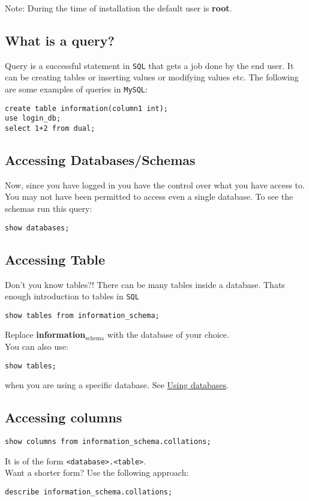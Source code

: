\documentclass[11pt]{article}
\begin{document}
Note: During the time of installation the default user is \textbf{root}.
\subsection{What is a query?}
\label{sec:org04b6374}
Query is a successful statement in \texttt{SQL} that gets a job done
by the end user. It can be creating tables or inserting values
or modifying values etc. The following are some examples of
queries in \texttt{MySQL}:
\begin{verbatim}
create table information(column1 int);
use login_db;
select 1+2 from dual;
\end{verbatim}
\subsection{Accessing Databases/Schemas}
\label{sec:org38fbf5d}
Now, since you have logged in you have the control over what
you have access to. You may not have been permitted to access
even a single database. To see the schemas run this query:
\begin{verbatim}
show databases;
\end{verbatim}
\subsection{Accessing Table}
\label{sec:orgc936a6d}
Don't you know tables?!
There can be many tables inside a database. Thats enough
introduction to tables in \texttt{SQL}
\begin{verbatim}
show tables from information_schema;
\end{verbatim}
Replace \textbf{information\(_{\text{schema}}\)} with the database of your
choice.\\
You can also use:
\begin{verbatim}
show tables;
\end{verbatim}
when you are using a specific database. See \hyperref[sec:org8226490]{Using databases}.
\subsection{Accessing columns}
\label{sec:org5d83a91}
\begin{verbatim}
show columns from information_schema.collations;
\end{verbatim}
It is of the form \texttt{<database>.<table>}.\\
Want a shorter form? Use the following approach:
\begin{verbatim}
describe information_schema.collations;
\end{verbatim}
\end{document}
